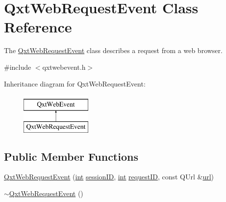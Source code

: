\hypertarget{class_qxt_web_request_event}{\section{Qxt\-Web\-Request\-Event Class Reference}
\label{class_qxt_web_request_event}
}


The \hyperlink{class_qxt_web_request_event}{Qxt\-Web\-Request\-Event} class describes a request from a web browser.  




{\ttfamily \#include $<$qxtwebevent.\-h$>$}

Inheritance diagram for Qxt\-Web\-Request\-Event\-:\begin{figure}[H]
\begin{center}
\leavevmode
\includegraphics[height=2.000000cm]{class_qxt_web_request_event}
\end{center}
\end{figure}
\subsection*{Public Member Functions}
\begin{DoxyCompactItemize}
\item 
\hyperlink{class_qxt_web_request_event_a88f3f502a61a0c81a413fc61d05344cc}{Qxt\-Web\-Request\-Event} (\hyperlink{ioapi_8h_a787fa3cf048117ba7123753c1e74fcd6}{int} \hyperlink{class_qxt_web_event_a3fdb1d80c46e535c2c79a06269a5d307}{session\-I\-D}, \hyperlink{ioapi_8h_a787fa3cf048117ba7123753c1e74fcd6}{int} \hyperlink{class_qxt_web_request_event_a79e20dd1cbc06f8cf1abe47bf6360277}{request\-I\-D}, const Q\-Url \&\hyperlink{class_qxt_web_request_event_a7478ca98a01fddf7b22b4c0f79c9d0a8}{url})
\item 
\hyperlink{class_qxt_web_request_event_a72b33b2123de75c4cc4f550182634f0c}{$\sim$\-Qxt\-Web\-Request\-Event} ()
\end{DoxyCompactItemize}
